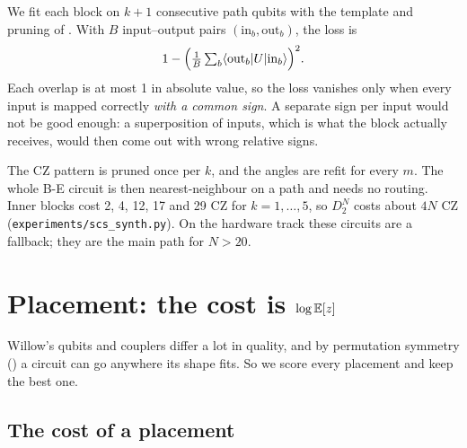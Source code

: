 \documentclass[11pt]{scrartcl}
\newcommand{\ket}[1]{\lvert #1\rangle}
\newcommand{\bra}[1]{\langle #1\rvert}
\newcommand{\D}[2]{D^{#1}_{#2}}
\newcommand{\CZ}{\ensuremath{\mathrm{CZ}}}
\newcommand{\file}[1]{\texttt{\small #1}}
\begin{document}
We fit each block on $k+1$ consecutive path qubits with the template and pruning of
. With $B$ input--output pairs $(\mathrm{in}_b,\mathrm{out}_b)$, the loss is
\[
  1-\Bigl(\tfrac1B\textstyle\sum_b\bra{\mathrm{out}_b}U\ket{\mathrm{in}_b}\Bigr)^2 .
\]
Each overlap is at most 1 in absolute value, so the loss vanishes only when every input is mapped
correctly \emph{with a common sign}. A separate sign per input would not be good enough: a
superposition of inputs, which is what the block actually receives, would then come out with wrong
relative signs.

The \CZ{} pattern is pruned once per $k$, and the angles are refit for every $m$. The whole B-E
circuit is then nearest-neighbour on a path and needs no routing. Inner blocks cost 2, 4, 12, 17 and
29 \CZ{} for $k=1,\dots,5$, so $\D N2$ costs about $4N$ \CZ{} (\file{experiments/scs\_synth.py}). On
the hardware track these circuits are a fallback; they are the main path for $N>20$.

\section{Placement: the cost is \texorpdfstring{$\log\mathbb E[z]$}{log E[z]}}

Willow's qubits and couplers differ a lot in quality, and by permutation symmetry
() a circuit can go anywhere its shape fits. So we score every placement and
keep the best one.

\subsection{The cost of a placement}
\end{document}
